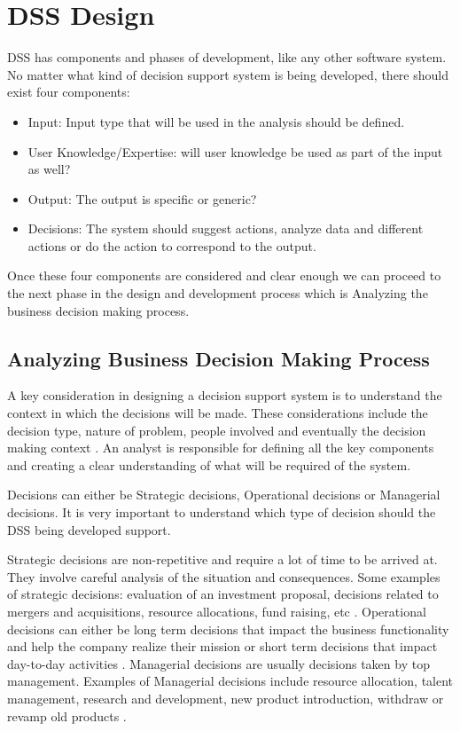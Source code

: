 \section{DSS Design}
\label{sec:DSSDesign}
DSS has components and phases of development, like any other software system. No matter what kind of decision support system is being developed, there should exist four components:
\begin{itemize}
	\item Input: Input type that will be used in the analysis should be defined.
	\item User Knowledge/Expertise: will user knowledge be used as part of the input as well?
	\item Output: The output is specific or generic?
	\item Decisions: The system should suggest actions, analyze data and different actions or do the action to correspond to the output.
\end{itemize}
Once these four components are considered and clear enough we can proceed to the next phase in the design and development process which is Analyzing the business decision making process.

\subsection{Analyzing Business Decision Making Process}
A key consideration in designing a decision support system is to understand the context in which the decisions will be made. These considerations include the decision type, nature of problem, people involved and eventually the decision making context \cite{DSS}. An analyst is responsible for defining all the key components and creating a clear understanding of what will be required of the system.

Decisions can either be Strategic decisions, Operational decisions or Managerial decisions. It is very important to understand which type of decision should the DSS being developed support. 

Strategic decisions are non-repetitive and require a lot of time to be arrived at. They involve careful analysis of the situation and consequences. Some examples of strategic decisions: evaluation of an investment proposal, decisions related to mergers and acquisitions, resource allocations, fund raising, etc \cite{DSS}. Operational decisions can either be long term decisions that impact the business functionality and help the company realize their mission or short term decisions that impact day-to-day activities \cite{DSS}. Managerial decisions are usually decisions taken by top management. Examples of Managerial decisions include resource allocation, talent management, research and development, new product introduction, withdraw or revamp old products \cite{DSS}.


